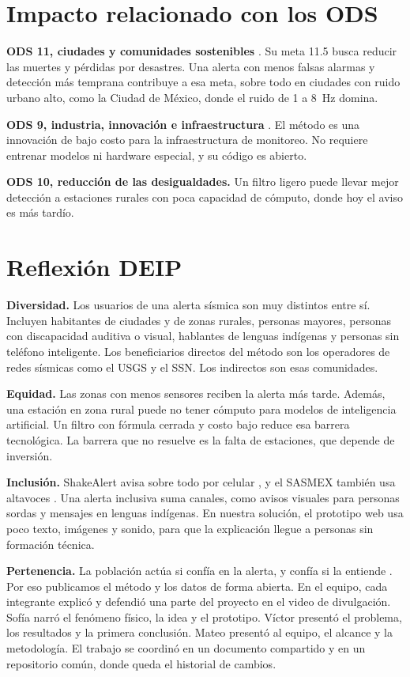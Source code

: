 \documentclass[11pt,letterpaper]{article}
\begin{document}
\section{Impacto relacionado con los ODS}
\textbf{ODS 11, ciudades y comunidades sostenibles} \parencite{onu11}. Su meta 11.5 busca reducir las muertes y pérdidas por desastres. Una alerta con menos falsas alarmas y detección más temprana contribuye a esa meta, sobre todo en ciudades con ruido urbano alto, como la Ciudad de México, donde el ruido de 1 a \SI{8}{Hz} domina.

\textbf{ODS 9, industria, innovación e infraestructura} \parencite{onu9}. El método es una innovación de bajo costo para la infraestructura de monitoreo. No requiere entrenar modelos ni hardware especial, y su código es abierto.

\textbf{ODS 10, reducción de las desigualdades.} Un filtro ligero puede llevar mejor detección a estaciones rurales con poca capacidad de cómputo, donde hoy el aviso es más tardío.

\section{Reflexión DEIP}
\textbf{Diversidad.} Los usuarios de una alerta sísmica son muy distintos entre sí. Incluyen habitantes de ciudades y de zonas rurales, personas mayores, personas con discapacidad auditiva o visual, hablantes de lenguas indígenas y personas sin teléfono inteligente. Los beneficiarios directos del método son los operadores de redes sísmicas como el USGS y el SSN. Los indirectos son esas comunidades.

\textbf{Equidad.} Las zonas con menos sensores reciben la alerta más tarde. Además, una estación en zona rural puede no tener cómputo para modelos de inteligencia artificial. Un filtro con fórmula cerrada y costo bajo reduce esa barrera tecnológica. La barrera que no resuelve es la falta de estaciones, que depende de inversión.

\textbf{Inclusión.} ShakeAlert avisa sobre todo por celular \parencite{usgs_faq}, y el SASMEX también usa altavoces \parencite{sasmex}. Una alerta inclusiva suma canales, como avisos visuales para personas sordas y mensajes en lenguas indígenas. En nuestra solución, el prototipo web usa poco texto, imágenes y sonido, para que la explicación llegue a personas sin formación técnica.

\textbf{Pertenencia.} La población actúa si confía en la alerta, y confía si la entiende \parencite{allen2018eos}. Por eso publicamos el método y los datos de forma abierta. En el equipo, cada integrante explicó y defendió una parte del proyecto en el video de divulgación. Sofía narró el fenómeno físico, la idea y el prototipo. Víctor presentó el problema, los resultados y la primera conclusión. Mateo presentó al equipo, el alcance y la metodología. El trabajo se coordinó en un documento compartido y en un repositorio común, donde queda el historial de cambios.
\end{document}
